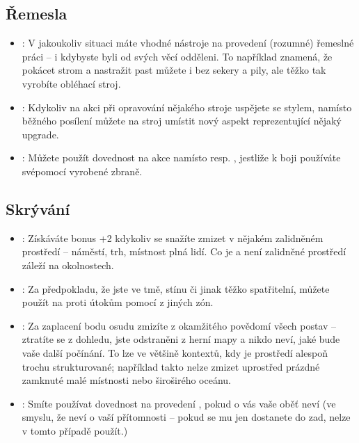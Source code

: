 \documentclass[../main.tex]{subfiles}
\begin{document}
\subsection{Řemesla}
\label{sec:trik-remesla}
\begin{itemize}
  
\item{}:
\label{sec:remesla-pripraven}
V jakoukoliv situaci máte vhodné nástroje na provedení (rozumné) řemeslné práci – i kdybyste byli od svých věcí odděleni. To například znamená, že pokácet strom a nastražit past můžete i bez sekery a pily, ale těžko tak vyrobíte obléhací stroj.

\item{}:
\label{sec:remesla-lepsi}
Kdykoliv na akci  při opravování nějakého stroje uspějete se stylem, namísto běžného posílení můžete na stroj umístit nový aspekt reprezentující nějaký upgrade.

\item {}:
\label{sec:remesla-zbrane}
 Můžete použít dovednost  na akce  namísto  resp. , jestliže k boji používáte svépomocí vyrobené zbraně.

\end{itemize}



\subsection{Skrývání}
\label{sec:trik-skryvani}
\begin{itemize}
  
\item{}:
\label{sec:skryvani-tvar}
Získáváte bonus +2 kdykoliv se snažíte zmizet v nějakém zalidněném prostředí – náměstí, trh, místnost plná lidí. Co je a není zalidněné prostředí záleží na okolnostech.

\item{}:
\label{sec:skryvani-nejasny}
Za předpokladu, že jste ve tmě, stínu či jinak těžko spatřitelní, můžete použít  na  proti útokům pomocí  z jiných zón.

\item{}:
\label{sec:skryvani-zmizel}
  Za zaplacení bodu osudu zmizíte z okamžitého povědomí všech postav – ztratíte se z dohledu, jste odstraněni z herní mapy a nikdo neví, jaké bude vaše další počínání. To lze ve většině kontextů, kdy je prostředí alespoň trochu strukturované; například takto nelze zmizet uprostřed prázdné zamknuté malé místnosti nebo široširého oceánu.

\item{}:
\label{sec:skryvani-utok}
 Smíte používat dovednost  na provedení , pokud o vás vaše oběť neví (ve smyslu, že neví o vaší přítomnosti – pokud se mu jen dostanete do zad, nelze v tomto případě  použít.)
\end{itemize}
\end{document}
